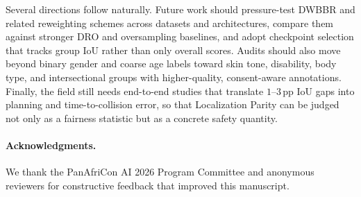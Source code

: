 \documentclass[runningheads]{llncs}
\begin{document}
Several directions follow naturally. Future work should pressure-test DWBBR and
related reweighting schemes across datasets and architectures, compare them
against stronger DRO and oversampling baselines, and adopt checkpoint selection
that tracks group IoU rather than only overall scores. Audits should also move
beyond binary gender and coarse age labels toward skin tone, disability, body
type, and intersectional groups with higher-quality, consent-aware annotations.
Finally, the field still needs end-to-end studies that translate $1$--$3$\,pp
IoU gaps into planning and time-to-collision error, so that Localization Parity
can be judged not only as a fairness statistic but as a concrete safety
quantity.

\paragraph{Acknowledgments.}
We thank the PanAfriCon AI 2026 Program Committee and anonymous reviewers for
constructive feedback that improved this manuscript.

\FloatBarrier
\clearpage
\end{document}
